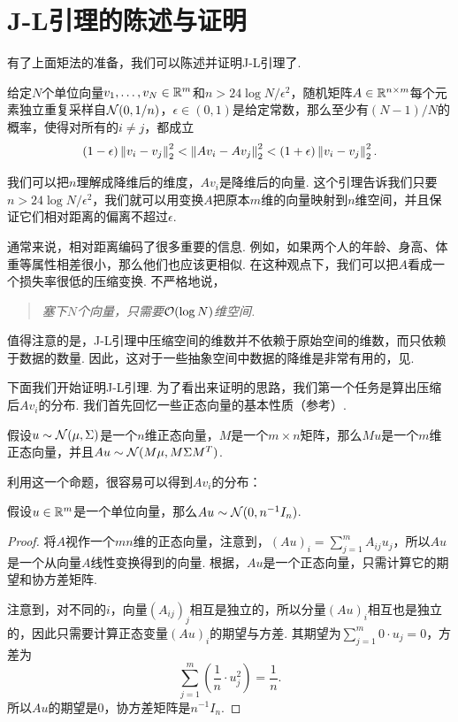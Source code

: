 \section{J-L引理的陈述与证明}
有了上面矩法的准备，我们可以陈述并证明J-L引理了.
\begin{theorem}\label{thm:johnson-lindenstrauss-lemma}
给定$N$个单位向量$v_1,\dots,v_N\in\mathbb{R}^m$和$n >24\log N/\epsilon^2$，随机矩阵$A\in \mathbb{R}^{n\times m}$每个元素独立重复采样自$\mathcal{N}(0,1/n)$，$\epsilon \in (0,1)$是给定常数，那么至少有$(N-1)/N$的概率，使得对所有的$i\neq j$，都成立
    \[
        (1 - \epsilon)\left\|v_i-v_j\right\|_2^2 <\left\|Av_i-Av_j\right\|_2^2 < (1 + \epsilon)\left\|v_i-v_j\right\|_2^2.
    \]
\end{theorem}

我们可以把$n$理解成降维后的维度，$Av_i$是降维后的向量. 这个引理告诉我们只要$n > 24\log N/\epsilon^2$，我们就可以用变换$A$把原本$m$维的向量映射到$n$维空间，并且保证它们相对距离的偏离不超过$\epsilon$.

通常来说，相对距离编码了很多重要的信息. 例如，如果两个人的年龄、身高、体重等属性相差很小，那么他们也应该更相似. 在这种观点下，我们可以把$A$看成一个损失率很低的压缩变换. 不严格地说，
\begin{quotation}
    \textit{塞下$N$个向量，只需要$\mathcal{O}(\log N)$维空间.}
\end{quotation}

值得注意的是，J-L引理中压缩空间的维数并不依赖于原始空间的维数，而只依赖于数据的数量. 因此，这对于一些抽象空间中数据的降维是非常有用的，见.

下面我们开始证明J-L引理. 为了看出来证明的思路，我们第一个任务是算出压缩后$Av_i$的分布. 我们首先回忆一些正态向量的基本性质（参考）. 

\begin{proposition}\label{prop:gaussian-vector}
假设$u\sim\mathcal{N}(\mu,\Sigma)$是一个$n$维正态向量，$M$是一个$m\times n$矩阵，那么$Mu$是一个$m$维正态向量，并且$Au\sim \mathcal{N}(M\mu,M\Sigma M^T)$.
\end{proposition}

利用这一个命题，很容易可以得到$Av_i$的分布：

\begin{lemma}\label{lemma:gaussian-vector}
    假设$u\in\mathbb{R}^m$是一个单位向量，那么$Au\sim \mathcal{N}(0,n^{-1}I_n)$.
\end{lemma}
\begin{proof}
    将$A$视作一个$mn$维的正态向量，注意到，$(Au)_i = \sum_{j=1}^m A_{ij}u_j$，所以$Au$是一个从向量$A$线性变换得到的向量. 根据，$Au$是一个正态向量，只需计算它的期望和协方差矩阵. 
   
   注意到，对不同的$i$，向量$(A_{ij})_{j}$相互是独立的，所以分量$(Au)_i$相互也是独立的，因此只需要计算正态变量$(Au)_i$的期望与方差. 其期望为$\sum_{j=1}^m 0\cdot u_j = 0$，方差为
   \[\sum_{j=1}^m \left(\frac{1}{n}\cdot u_j^2\right) = \frac{1}{n}.\] 
   所以$Au$的期望是$0$，协方差矩阵是$n^{-1}I_n$.
\end{proof}

